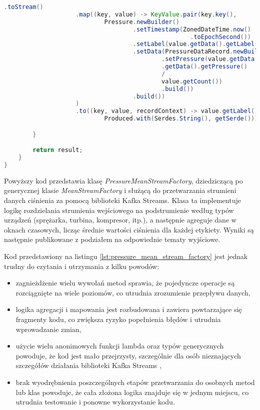 \begin{lstlisting}[caption=Poprzednia implementacja przetwarzająca strumienie danych, label={lst:pressure_mean_stream_factory},language=Java]
                    .toStream()
                    .map((key, value) -> KeyValue.pair(key.key(),
                            Pressure.newBuilder()
                                    .setTimestamp(ZonedDateTime.now()
                                                    .toEpochSecond())
                                    .setLabel(value.getData().getLabel())
                                    .setData(PressureDataRecord.newBuilder()
                                            .setPressure(value.getData()
                                            .getData().getPressure() 
                                            / 
                                            value.getCount())
                                            .build())
                                    .build())
                    )
                    .to((key, value, recordContext) -> value.getLabel().toString() + getOutputTopicsPostfix(),
                            Produced.with(Serdes.String(), getSerde()));

        }

        return result;
    }
}  

\end{lstlisting}

Powyższy kod przedstawia klasę \textit{PressureMeanStreamFactory}, dziedziczącą po generycznej klasie \textit{\mbox{MeanStreamFactory}} i służącą do przetwarzania strumieni danych ciśnienia za pomocą biblioteki Kafka Streams. Klasa ta implementuje logikę rozdzielania strumienia wejściowego na podstrumienie według typów urządzeń (sprężarka, turbina, kompresor, itp.), a następnie agreguje dane w oknach czasowych, licząc średnie wartości ciśnienia dla każdej etykiety. Wyniki są następnie publikowane z podziałem na odpowiednie tematy wyjściowe.

\vspace{0.3em}

Kod przedstawiony na listingu \ref{lst:pressure_mean_stream_factory} jest jednak trudny do czytania i utrzymania z kilku powodów:
\begin{itemize}
    \item zagnieżdżenie wielu wywołań metod sprawia, że pojedyncze operacje są rozciągnięte na wiele poziomów, co utrudnia zrozumienie przepływu danych,
    \item logika agregacji i mapowania jest rozbudowana i zawiera powtarzające się fragmenty kodu, co zwiększa ryzyko popełnienia błędów i utrudnia wprowadzanie zmian,
    \item użycie wielu anonimowych funkcji lambda oraz typów generycznych powoduje, że kod jest mało przejrzysty, szczególnie dla osób nieznających szczegółów działania biblioteki Kafka Streams \cite{kafka_streams},
    \item brak wyodrębnienia poszczególnych etapów przetwarzania do osobnych metod lub klas powoduje, że cała złożona logika znajduje się w jednym miejscu, co utrudnia testowanie i ponowne wykorzystanie kodu.
\end{itemize}

